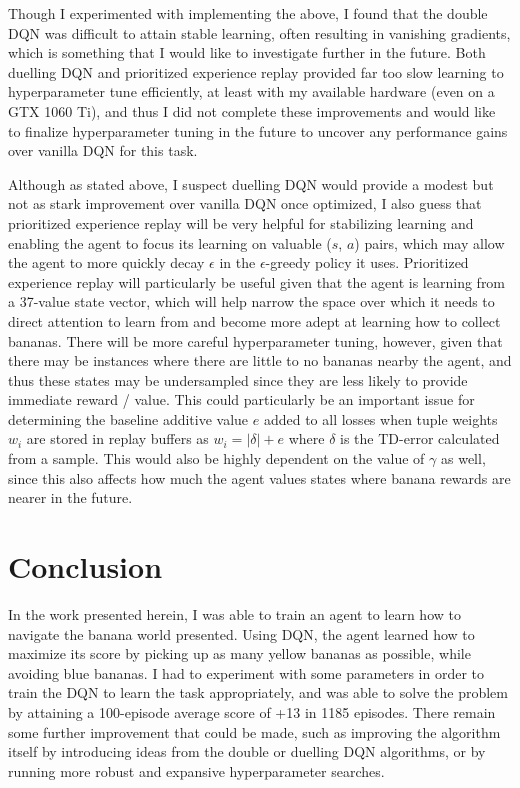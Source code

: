 \documentclass[11pt]{article}
\begin{document}
Though I experimented with implementing the above, I found that the double DQN was difficult to attain stable learning, often resulting in vanishing gradients, which is something that I would like to investigate further in the future. Both duelling DQN and prioritized experience replay provided far too slow learning to hyperparameter tune efficiently, at least with my available hardware (even on a GTX 1060 Ti), and thus I did not complete these improvements and would like to finalize hyperparameter tuning in the future to uncover any performance gains over vanilla DQN for this task.

Although as stated above, I suspect duelling DQN would provide a modest but not as stark improvement over vanilla DQN once optimized, I also guess that prioritized experience replay will be very helpful for stabilizing learning and enabling the agent to focus its learning on valuable ($s$, $a$) pairs, which may allow the agent to more quickly decay $\epsilon$ in the $\epsilon$-greedy policy it uses. Prioritized experience replay will particularly be useful given that the agent is learning from a 37-value state vector, which will help narrow the space over which it needs to direct attention to learn from and become more adept at learning how to collect bananas. There will be more careful hyperparameter tuning, however, given that there may be instances where there are little to no bananas nearby the agent, and thus these states may be undersampled since they are less likely to provide immediate reward / value. This could particularly be an important issue for determining the baseline additive value $e$ added to all losses when tuple weights $w_i$ are stored in replay buffers as $w_i = |\delta| + e$ where $\delta$ is the TD-error calculated from a sample. This would also be highly dependent on the value of $\gamma$ as well, since this also affects how much the agent values states where banana rewards are nearer in the future.

\section{Conclusion}

In the work presented herein, I was able to train an agent to learn how to navigate the banana world presented. Using DQN, the agent learned how to maximize its score by picking up as many yellow bananas as possible, while avoiding blue bananas. I had to experiment with some parameters in order to train the DQN to learn the task appropriately, and was able to solve the problem by attaining a 100-episode average score of +13 in 1185 episodes. There remain some further improvement that could be made, such as improving the algorithm itself by introducing ideas from the double or duelling DQN algorithms, or by running more robust and expansive hyperparameter searches.



\end{document}
